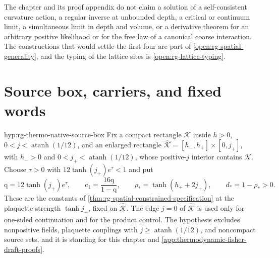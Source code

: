 The chapter and its proof appendix do not claim a solution of a
self-consistent curvature action, a regular inverse at unbounded depth, a
critical or continuum limit, a simultaneous limit in depth and volume, or a
derivative theorem for an arbitrary positive likelihood or for the free law
of a canonical coarse interaction. The constructions that would settle the
first four are part of
\cref{open:rg-spatial-generality}, and the typing of the lattice sites is
\cref{open:rg-lattice-typing}. 

\section{Source box, carriers, and fixed words}
\label{sec:rg-thermo-native-families}

{hyp:rg-thermo-native-source-box}
Fix a compact rectangle $\mathcal K$ inside $h>0$,
$0<j<\operatorname{atanh}(1/12)$, and an enlarged rectangle
$\widehat{\mathcal K}=[h_-,h_+]\times[0,j_+]$, with $h_->0$ and
$0<j_+<\operatorname{atanh}(1/12)$, whose positive-$j$ interior contains
$\mathcal K$. Choose $\tau>0$ with $12\tanh(j_+)e^\tau<1$ and put
\begin{equation}
 \mathrm q=12\tanh(j_+)e^\tau,\qquad
 \mathrm c_1=\frac{16\mathrm q}{1-\mathrm q},\qquad
 \rho_* =\tanh(h_++2j_+),\qquad d_*=1-\rho_*>0.
 \label{eq:rg-thermo-native-compact-constants}
\end{equation}
These are the constants of \cref{thm:rg-spatial-constrained-specification}
at the plaquette strength $\tanh j_+$, fixed on $\widehat{\mathcal K}$. The
edge $j=0$ of $\widehat{\mathcal K}$ is used only for one-sided continuation
and for the product control. The hypothesis excludes nonpositive fields,
plaquette couplings with $j\geq\operatorname{atanh}(1/12)$, and noncompact
source sets, and it is standing for this chapter and
\cref{app:thermodynamic-fisher-draft-proofs}.

